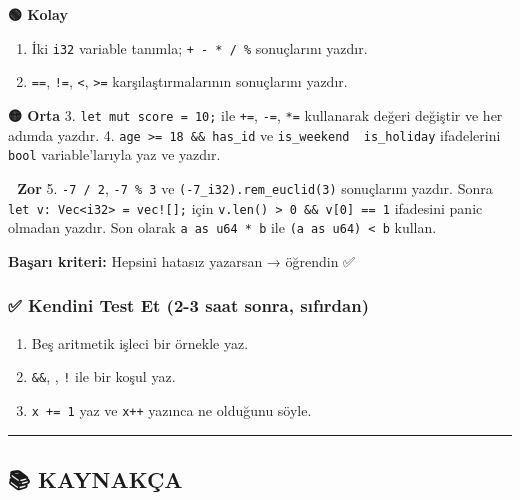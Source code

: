 \documentclass[12pt,a4paper]{article}
\begin{document}
\textbf{🟢 Kolay}

\begin{enumerate}
\def\labelenumi{\arabic{enumi}.}
\tightlist
\item
  İki \texttt{i32} variable tanımla; \texttt{+\ -\ *\ /\ \%} sonuçlarını yazdır.
\item
  \texttt{==}, \texttt{!=}, \texttt{\textless{}}, \texttt{\textgreater{}=} karşılaştırmalarının sonuçlarını yazdır.
\end{enumerate}

\textbf{🟡 Orta}
3. \texttt{let\ mut\ score\ =\ 10;} ile \texttt{+=}, \texttt{-=}, \texttt{*=} kullanarak değeri değiştir ve her adımda yazdır.
4. \texttt{age\ \textgreater{}=\ 18\ \&\&\ has\_id} ve \texttt{is\_weekend\ \textbar{}\textbar{}\ is\_holiday} ifadelerini \texttt{bool} variable'larıyla yaz ve yazdır.

\textbf{🔴 Zor}
5. \texttt{-7\ /\ 2}, \texttt{-7\ \%\ 3} ve \texttt{(-7\_i32).rem\_euclid(3)} sonuçlarını yazdır. Sonra \texttt{let\ v:\ Vec\textless{}i32\textgreater{}\ =\ vec!{[}{]};} için \texttt{v.len()\ \textgreater{}\ 0\ \&\&\ v{[}0{]}\ ==\ 1} ifadesini panic olmadan yazdır. Son olarak \texttt{a\ as\ u64\ *\ b} ile \texttt{(a\ as\ u64)\ \textless{}\ b} kullan.

\textbf{Başarı kriteri:} Hepsini hatasız yazarsan → öğrendin ✅

\subsubsection{✅ Kendini Test Et (2-3 saat sonra, sıfırdan)}\label{kendini-test-et-2-3-saat-sonra-sıfırdan-4}

\begin{enumerate}
\def\labelenumi{\arabic{enumi}.}
\tightlist
\item
  Beş aritmetik işleci bir örnekle yaz.
\item
  \texttt{\&\&}, \texttt{\textbar{}\textbar{}}, \texttt{!} ile bir koşul yaz.
\item
  \texttt{x\ +=\ 1} yaz ve \texttt{x++} yazınca ne olduğunu söyle.
\end{enumerate}

\begin{center}\rule{0.5\linewidth}{0.5pt}\end{center}

\subsection{📚 KAYNAKÇA}\label{kaynakça-4}
\end{document}
